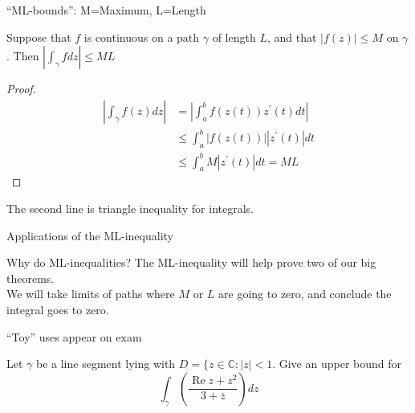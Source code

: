 \documentclass{beamer}
\newcommand{\C}{\mathbb{C}}
\DeclareMathOperator{\Real}{Re}
\begin{document}
\begin{frame}{``ML-bounds'': M=Maximum, L=Length}
\begin{theorem} Suppose that $f$ is continuous on a path $\gamma$ of length $L$, and that $|f(z)|\leq M$ on $\gamma$.  Then $|\int_\gamma f dz|\leq ML$
\end{theorem}
\begin{proof}\begin{align*}
    \left|\int_\gamma f(z)dz\right|&=\left|\int_a^b f(z(t))z^\prime(t)dt\right| \\
    &\leq \int_a^b |f(z(t))| |z^\prime(t)| dt \\
    &\leq \int_a^b M |z^\prime(t)| dt = ML
\end{align*}
\end{proof}
The second line is triangle inequality for integrals.
\end{frame}
\begin{frame}{Applications of the ML-inequality}
\begin{block}{Why do ML-inequalities?}
The ML-inequality will help prove two of our big theorems.  \\
We will take limits of paths where $M$ or $L$ are going to zero, and conclude the integral goes to zero.
\end{block}
\alert{``Toy'' uses appear on exam}
\begin{example}
Let $\gamma$ be a line segment lying with $D=\{z\in\C: |z|<1$.  Give an upper bound for 
$$\int_\gamma \left(\frac{\Real{z}+z^2}{3+\overline{z}}\right)dz$$
\end{example}

\end{frame}
\end{document}
